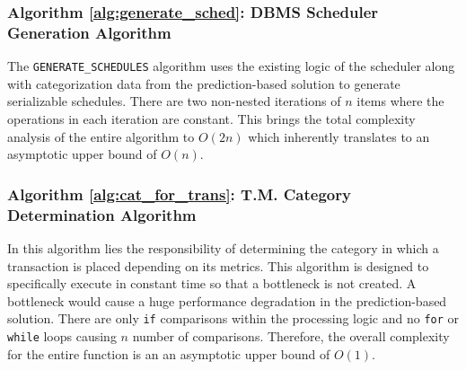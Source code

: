\documentclass[conference]{IEEEtran}
\begin{document}
\subsubsection{Algorithm \ref{alg:generate_sched}: DBMS Scheduler Generation Algorithm}
\label{alg_complex:gen_sched}
The \verb|GENERATE_SCHEDULES| algorithm uses the existing logic of the scheduler along with categorization data from the prediction-based solution to generate serializable schedules. There are two non-nested iterations of $n$ items where the operations in each iteration are constant. This brings the total complexity analysis of the entire algorithm to $O(2n)$ which inherently translates to an asymptotic upper bound of $O(n)$.

\subsubsection{Algorithm \ref{alg:cat_for_trans}: T.M. Category Determination Algorithm}
In this algorithm lies the responsibility of determining the category in which a transaction is placed depending on its metrics. This algorithm is designed to specifically execute in constant time so that a bottleneck is not created. A bottleneck would cause a huge performance degradation in the prediction-based solution. There are only \verb|if| comparisons within the processing logic and no \verb|for| or \verb|while| loops causing $n$ number of comparisons. Therefore, the overall complexity for the entire function is an an asymptotic upper bound of $O(1)$. 
\end{document}
